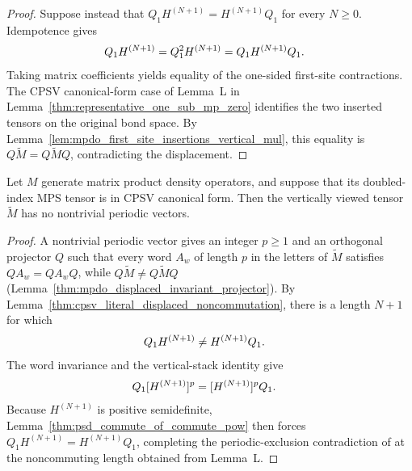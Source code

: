 \begin{proof}
    \leanok
    Suppose instead that $Q_1H^{(N+1)}=H^{(N+1)}Q_1$ for every $N\geq0$.
    Idempotence gives
    \begin{align}
        Q_1H^{(N+1)}
         & =Q_1^2H^{(N+1)}
        =Q_1H^{(N+1)}Q_1.
        \notag
    \end{align}
    Taking matrix coefficients yields equality of the one-sided first-site
    contractions. The CPSV canonical-form case of Lemma~L in
    Lemma~\ref{thm:representative_one_sub_mp_zero} identifies the two
    inserted tensors on the original bond space. By
    Lemma~\ref{lem:mpdo_first_site_insertions_vertical_mul}, this equality is
    $Q\widetilde M=Q\widetilde M Q$, contradicting the displacement.
\end{proof}

\begin{lemma}
    \label{thm:mpdo_vertical_no_periodic_vectors_literal_cpsv}
    \leanok
    Let $M$ generate matrix product density operators, and suppose that its
    doubled-index MPS tensor is in CPSV canonical form. Then the
    vertically viewed tensor $\widetilde M$ has no nontrivial periodic
    vectors.
\end{lemma}

\begin{proof}
    \leanok
    A nontrivial periodic vector gives an integer $p\geq1$ and an
    orthogonal projector $Q$ such that every word $A_w$ of length $p$ in the
    letters of $\widetilde M$ satisfies $QA_w=QA_wQ$, while
    $Q\widetilde M\ne Q\widetilde M Q$
    (Lemma~\ref{thm:mpdo_displaced_invariant_projector}). By
    Lemma~\ref{thm:cpsv_literal_displaced_noncommutation}, there is a length
    $N+1$ for which
    \begin{align}
        Q_1H^{(N+1)} & \ne H^{(N+1)}Q_1.
        \notag
    \end{align}
    The word invariance and the vertical-stack identity give
    \begin{align}
        Q_1[H^{(N+1)}]^p & =[H^{(N+1)}]^pQ_1.
        \notag
    \end{align}
    Because $H^{(N+1)}$ is positive semidefinite,
    Lemma~\ref{thm:psd_commute_of_commute_pow} then forces
    $Q_1H^{(N+1)}=H^{(N+1)}Q_1$, completing the periodic-exclusion
    contradiction of
    \cite[Proposition~4.13, lines~1888--1893]{Cirac2016MPDO_arXiv} at the
    noncommuting length obtained from Lemma~L.
\end{proof}

